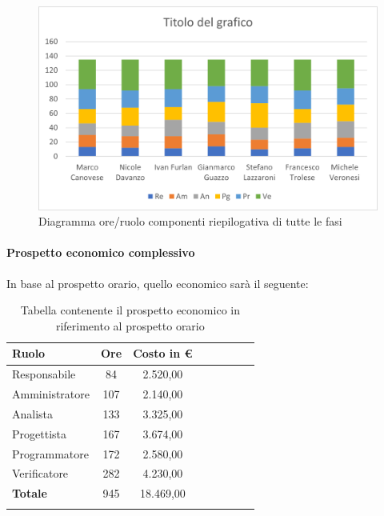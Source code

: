 			\begin{figure}[H]
				\centering
				\includegraphics[width=0.8\linewidth]{res/images/preventivo/tot1.png}
				\caption{Diagramma ore/ruolo componenti riepilogativa di tutte le fasi}
				\label{fig:diagramma suddivisione ruoli riepilogativa di tutte le fasi}
			\end{figure}
		
			\paragraph{Prospetto economico complessivo}
			In base al prospetto orario, quello economico sarà il seguente: 
			
			\begin{longtable}{|l|c|c|c|c|c|c|c|}
				\hline
				\rowcolor{lighter-grayer}
				\textbf{Ruolo} & \textbf{Ore} & \textbf{Costo in €} \\
				\hline
				\endfirsthead
				
				\hline
				Responsabile & 84 & 2.520,00\\
				\hline
				\hline
				Amministratore & 107 & 2.140,00\\
				\hline
				\hline
				Analista & 133 & 3.325,00\\
				\hline
				\hline
				Progettista & 167 & 3.674,00\\
				\hline
				\hline
				Programmatore & 172 & 2.580,00\\
				\hline
				\hline
				Verificatore & 282 & 4.230,00\\
				\hline
				\hline
				\textbf{Totale} & 945 & 18.469,00\\
				\hline
				\rowcolor{white}
				\caption{Tabella contenente il prospetto economico in riferimento al prospetto orario}
			\end{longtable}
			\pagebreak
		
